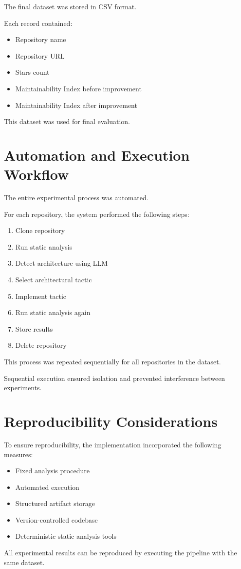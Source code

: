 The final dataset was stored in CSV format.

Each record contained:

\begin{itemize}
\item Repository name
\item Repository URL
\item Stars count
\item Maintainability Index before improvement
\item Maintainability Index after improvement
\end{itemize}

This dataset was used for final evaluation.

\section{Automation and Execution Workflow}

The entire experimental process was automated.

For each repository, the system performed the following steps:

\begin{enumerate}
\item Clone repository
\item Run static analysis
\item Detect architecture using LLM
\item Select architectural tactic
\item Implement tactic
\item Run static analysis again
\item Store results
\item Delete repository
\end{enumerate}

This process was repeated sequentially for all repositories in the dataset.

Sequential execution ensured isolation and prevented interference between experiments.

\section{Reproducibility Considerations}

To ensure reproducibility, the implementation incorporated the following measures:

\begin{itemize}
\item Fixed analysis procedure
\item Automated execution
\item Structured artifact storage
\item Version-controlled codebase
\item Deterministic static analysis tools
\end{itemize}

All experimental results can be reproduced by executing the pipeline with the same dataset.
